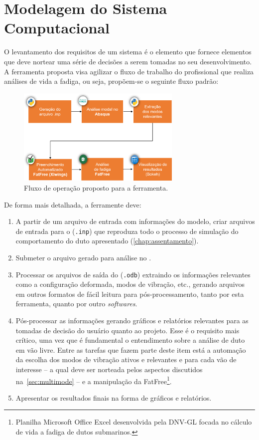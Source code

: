 \chapter{Modelagem do Sistema Computacional}\label{sec:software}

O levantamento dos requisitos de um sistema é o elemento que fornece elementos que deve nortear uma série de decisões a serem tomadas no seu desenvolvimento. A ferramenta proposta visa agilizar o fluxo de trabalho do profissional que realiza análises de vida a fadiga, ou seja, propõem-se o seguinte fluxo padrão:

\begin{figure}[!ht]
    \centering
    \caption{Fluxo de operação proposto para a ferramenta.}\label{fig:workflow}
    \includegraphics[width=0.7\textwidth]{imagens/workflow}
\end{figure}

De forma mais detalhada, a ferramente deve:

\begin{enumerate}
    \item A partir de um arquivo de entrada com informações do modelo, criar arquivos de entrada para o \abaqus (\texttt{.inp}) que reproduza todo o processo de simulação do comportamento do duto apresentado (\autoref{chap:assentamento}).
    \item Submeter o arquivo gerado para análise no \abaqus.\@
    \item Processar os arquivos de saída do \abaqus (\texttt{.odb}) extraindo os informações relevantes como a configuração deformada, modos de vibração, etc., gerando arquivos em outros formatos de fácil leitura para pós-processamento, tanto por esta ferramenta, quanto por outro \textit{softwares}.
    \item Pós-processar as informações gerando gráficos e relatórios relevantes para as tomadas de decisão do usuário quanto ao projeto. Esse é o requisito mais crítico, uma vez que é fundamental o entendimento sobre a análise de duto em vão livre. Entre as tarefas que fazem parte deste item está a automação da escolha dos modos de vibração ativos e relevantes e para cada vão de interesse -- a qual deve ser norteada pelos aspectos discutidos na~\autoref{sec:multimode} -- e a manipulação da FatFree\footnote{Planilha Microsoft Office Excel desenvolvida pela DNV-GL focada no cálculo de vida a fadiga de dutos submarinos.}.
    \item Apresentar os resultados finais na forma de gráficos e relatórios.
\end{enumerate}

